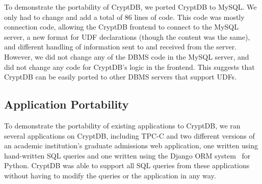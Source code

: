 To demonstrate the portability of CryptDB, we ported
CryptDB to MySQL\@.  We only had to change and add a total
of $86$ lines of code.  This code was mostly connection code,
allowing the CryptDB frontend to connect to the MySQL server,
a new format for UDF declarations (though the content
was the same), and different handling of information sent to and
received from the server.  However, we did not change any of
the DBMS code in the MySQL server, and did not change any code
for CryptDB's logic in the frontend.  This suggests that CryptDB
can be easily ported to other DBMS servers that support UDFs.



\subsection{Application Portability}

To demonstrate the portability of existing applications to
CryptDB, we ran several applications on CryptDB,
including TPC-C and two different versions of an academic institution's 
graduate admissions web application, one written using hand-written SQL
queries and one
written using the Django ORM system~\cite{bib:django} for Python.  CryptDB
was able to support all SQL queries from these applications without having
to modify the queries or the application in any way. 







